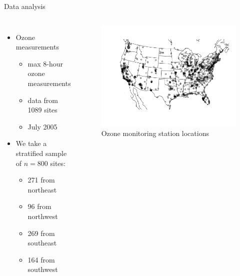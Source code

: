\documentclass{beamer}
\begin{document}
\begin{frame}{Data analysis}
\begin{columns}[c]
	\begin{itemize} \setlength{\itemsep}{0.5em}
	\item Ozone measurements
	\begin{itemize}
		\item max 8-hour ozone measurements
		\item data from 1089 sites
		\item July 2005
	\end{itemize}
  \item We take a stratified sample of $n = 800$ sites:
  \begin{itemize}
    \item 271 from northeast
    \item 96 from northwest
    \item 269 from southeast
    \item 164 from southwest
  \end{itemize}
	\end{itemize}

	\begin{figure}
    \includegraphics[width=1\linewidth]{./plots/pot/ozone_stations.pdf}
    \caption{Ozone monitoring station locations}
    \end{figure}
\end{columns}
\end{frame}
\end{document}
